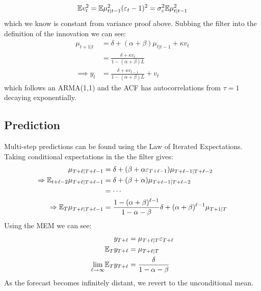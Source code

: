 \documentclass[DIV=14,titlepage=false]{scrreprt}
\begin{document}
\[
    \mathbb{E} v_t^2 = \mathbb{E} \mu_{t|t-1}^2(\varepsilon_t-1)^2=\sigma^2_\varepsilon \mathbb{E} \mu_{t|t-1}^2
\]
which we know is constant from variance proof above. Subbing the filter into the definition of the innovation we can see:
\begin{align*}
    \mu_{t+1|t} &= \delta + (\alpha+\beta)\mu_{t|t-1} +\kappa v_t\\
    &= \frac{\delta + \kappa v_t}{1-(\alpha+\beta)L}\\
    \implies y_t &= \frac{\delta + \kappa v_{t-1}}{1-(\alpha+\beta)L}+v_t
\end{align*}
which follows an ARMA(1,1) and the ACF has autocorrelations from $\tau=1$ decaying exponentially.
\subsection{Prediction}
Multi-step predictions can be found using the Law of Iterated Expectations. Taking conditional expectations in the the filter gives:
\begin{align*}
    \mu_{T+\ell|T+\ell -1} &= \delta + (\beta + \alpha \varepsilon_{T+\ell -1})\mu_{T+\ell-1|T+\ell -2}\\
    \Rightarrow \mathbb{E}_{t+\ell-2} \mu_{T+\ell|T+\ell -1} &= \delta + (\beta + \alpha )\mu_{T+\ell-1|T+\ell -2}\\
    &= \cdots\\
    \Rightarrow \mathbb{E}_T \mu_{T+\ell|T+\ell -1} &= \frac{1-(\alpha+\beta)^{\ell -1}}{1-\alpha-\beta}\delta + (\alpha+\beta)^{\ell-1}\mu_{T+1|T}
\end{align*}
Using the MEM we can see:
\begin{align*}
    y_{T+\ell}&=\mu_{T+\ell|T}\varepsilon_{T+\ell}\\
    \mathbb{E}_T y_{T+\ell}&=\mu_{T+\ell|T}\\
    \underset{\ell \to \infty}{\lim} \mathbb{E}_T y_{T+\ell}&=\frac{\delta}{1-\alpha-\beta}
\end{align*}
As the forecast becomes infinitely distant, we revert to the unconditional mean.
\end{document}
